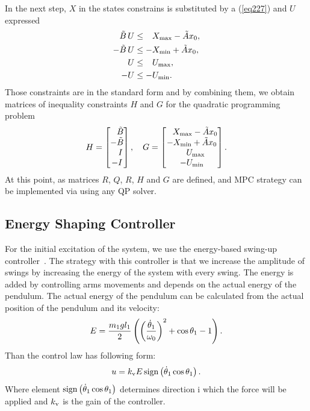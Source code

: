 In the next step, $X$ in the states constrains is substituted by a (\ref{eq227}) and $U$ expressed
\begin{subequations}
	\begin{align}
	\tilde{B}\,U &\leq \ \; \,X _{\text{max}} - \tilde{A}x_0,\\
	-\tilde{B}\,U &\leq -X _{\text{min}} + \tilde{A}x_0,\\
	U &\leq \ \; \,U _{\text{max}},\\
	-U &\leq -U _{\text{min}}.
	\end{align}
\end{subequations}
Those constraints are in the standard form and by combining them, we obtain matrices of inequality constraints $H$ and $G$ for the quadratic programming problem
\begin{equation}
	H = \begin{bmatrix}
	\ \; \,\tilde{B}\\
	-\tilde{B}\\
	\ \ \, I\\
	-I\\
	\end{bmatrix}, \quad
	G = \begin{bmatrix}
	\ \; \,X _{\text{max}} - \tilde{A}x_0\\
	-X _{\text{min}} + \tilde{A}x_0\\
	\ \ \:U _{\text{max}}\\
	-U _{\text{min}}
	\end{bmatrix}.
\end{equation}
At this point, as matrices $R$, $Q$, $R$, $H$ and $G$ are defined, and MPC strategy can be implemented via using any QP solver.
\subsection{Energy Shaping Controller}\label{energyshapingsection}
For the initial excitation of the system, we use the energy-based swing-up controller~\cite{furuta:swing}. The strategy with this controller is that we increase the amplitude of swings by increasing the energy of the system with every swing. The energy is added by controlling arms movements and depends on the actual energy of the pendulum. The actual energy of the pendulum can be calculated from the actual position of the pendulum and its velocity: 
\begin{equation}
E = \frac{m_1gl_1}{2}\left( \left( \frac{\dot{\theta}_1}{\omega_0} \right)^2+\cos\theta_1 - 1 \right).
\end{equation}
Than the control law has following form:
\begin{equation}\label{energy-shaping}
	u = k _{\text{v}}E\,\mathrm{sign}\left( \dot{\theta}_1\cos\theta_1 \right).
\end{equation}
Where element $\mathrm{sign}\left( \dot{\theta}_1\cos\theta_1 \right)$ determines direction i which the force will be applied and $k _{\text{v}}$ is the gain of the controller.
